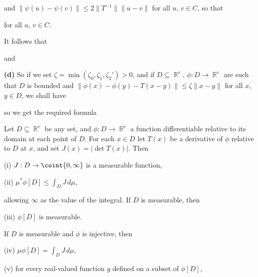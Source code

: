 {\noindent and $\|\psi(u)-\psi(v)\|\le 2\|T^{-1}\|\|u-v\|$ for all $u$,
$v\in C$, so that


\noindent for all $u$, $v\in C$.

It follows that


\noindent and


\medskip

{\bf (d)} So if we set $\zeta=\min(\zeta_0,\zeta_1,\zeta_2')>0$, and if
$D\subseteq\BbbR^r$, $\phi:D\to\BbbR^r$ are such that  $D$ is bounded
and
$\|\phi(x)-\phi(y)-T(x-y)\|\le\zeta\|x-y\|$ for all $x$, $y\in D$, we
shall have



\noindent so we get the required formula

}%

 Let $D\subseteq\BbbR^r$ be any set, and
$\phi:D\to\BbbR^r$ a function differentiable relative to its domain at
each point of $D$.   For each $x\in D$ let $T(x)$ be a derivative of
$\phi$ relative to $D$ at $x$, and set $J(x)=|\det T(x)|$.   Then

\quad (i) $J:D\to\coint{0,\infty}$ is a measurable function,

\quad (ii) $\mu^*\phi[D]\le\int_DJ\,d\mu$,

\noindent allowing $\infty$ as the value of the integral.  If $D$ is
measurable, then

\quad (iii) $\phi[D]$ is measurable.

\noindent If $D$ is measurable and $\phi$ is injective, then

\quad (iv) $\mu\phi[D]=\int_DJ\,d\mu$,

\quad (v) for every real-valued function $g$ defined on a subset of
$\phi[D]$,

